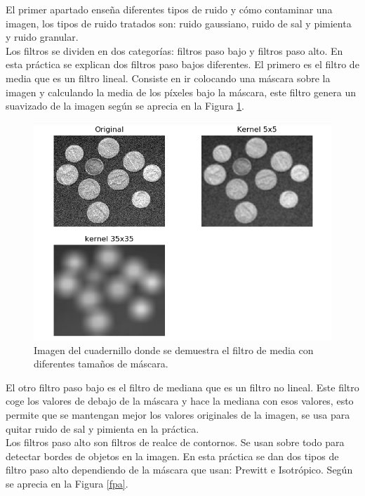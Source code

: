 El primer apartado enseña diferentes tipos de ruido y cómo contaminar una imagen, los tipos de ruido tratados son: ruido gaussiano, ruido de sal y pimienta y ruido granular.\\

Los filtros se dividen en dos categorías: filtros paso bajo y filtros paso alto. En esta práctica se explican dos filtros paso bajos diferentes. El primero es el filtro de media que es un filtro lineal. Consiste en ir colocando una máscara sobre la imagen y calculando la media de los píxeles bajo la máscara, este filtro genera un suavizado de la imagen según se aprecia en la Figura \ref{filtromedia}.\\

\begin{figure}[h]
\centering
\includegraphics[width=1\textwidth]{imagenes/filtromedia}
\caption{Imagen del cuadernillo donde se demuestra el filtro de media con diferentes tamaños de máscara.}
\label{filtromedia}
\end{figure}

El otro filtro paso bajo es el filtro de mediana que es un filtro no lineal. Este filtro coge los valores de debajo de la máscara y  hace la mediana con esos valores, esto permite que se mantengan mejor los valores originales de la imagen, se usa para quitar ruido de sal y pimienta en la práctica.\\

Los filtros paso alto son filtros de realce de contornos. Se usan sobre todo para detectar bordes de objetos en la imagen. En esta práctica se dan dos tipos de filtro paso alto dependiendo de la máscara que usan: Prewitt e Isotrópico. Según se aprecia en la Figura \ref{fpa}.

